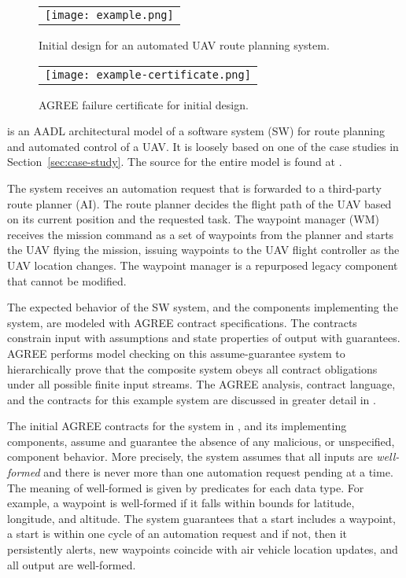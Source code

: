 \begin{figure*}[h]
  \begin{center}
    \begin{tabular}{c}
      \texttt{[image: example.png]}
    \end{tabular}
  \end{center}
\caption{Initial design for an automated UAV route planning system.}
\label{fig:example}
\end{figure*}

\begin{figure}
  \begin{center}
    \begin{tabular}{c}
      \texttt{[image: example-certificate.png]} \\
    \end{tabular}
  \end{center}
\caption{AGREE failure certificate for initial design.}
\label{fig:example-certificate}
\end{figure}

 is an AADL architectural model of a software system (SW) for route planning and automated control of a UAV.
It is loosely based on one of the case studies in Section~\ref{sec:case-study}.
The source for the entire model is found at \cite{repo}.

The system receives an automation request that is forwarded to a third-party route planner (AI).
The route planner decides the flight path of the UAV based on its current position and the requested task.
The waypoint manager (WM) receives the mission command as a set of waypoints from the planner and starts the UAV flying the mission, issuing waypoints to the UAV flight controller as the UAV location changes.
The waypoint manager is a repurposed legacy component that cannot be modified.

The expected behavior of the SW system, and the components implementing the system, are modeled with AGREE contract specifications.
The contracts constrain input with assumptions and state properties of output with guarantees.
AGREE performs model checking on this assume-guarantee system to hierarchically prove that the composite system obeys all contract obligations under all possible finite input streams. 
The AGREE analysis, contract language, and the contracts for this example system are discussed in greater detail in .

The initial AGREE contracts for the system in , and its implementing components, assume and guarantee the absence of any malicious, or unspecified, component behavior.
More precisely, the system assumes that all inputs are \emph{well-formed} and there is never more than one automation request pending at a time.
The meaning of well-formed is given by predicates for each data type.
For example, a waypoint is well-formed if it falls within bounds for latitude, longitude, and altitude.
The system guarantees that a start includes a waypoint, a start is within one cycle of an automation request and if not, then it persistently alerts, new waypoints coincide with air vehicle location updates, and all output are well-formed.

